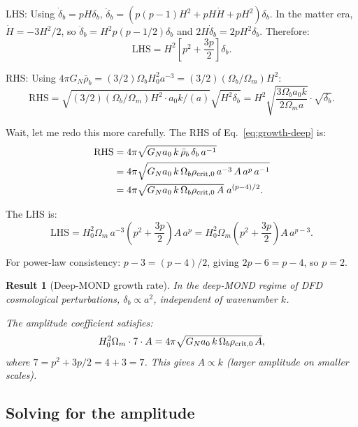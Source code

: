 \documentclass[11pt]{article}
\newtheorem{result}{Result}
\newcommand{\aM}{a_0}
\begin{document}
LHS: Using $\dot\delta_b = pH\delta_b$, $\ddot\delta_b
= (p(p-1)H^2 + pH\dot H + pH^2)\delta_b$. In the matter era,
$\dot H = -3H^2/2$, so $\ddot\delta_b = H^2 p(p - 1/2)\delta_b$
and $2H\dot\delta_b = 2pH^2\delta_b$. Therefore:
\begin{equation}
\text{LHS} = H^2\left[p^2 + \frac{3p}{2}\right]\delta_b.
\end{equation}

RHS: Using $4\pi G_N\bar\rho_b = (3/2)\Omega_b H_0^2 a^{-3}
= (3/2)(\Omega_b/\Omega_m)H^2$:
\begin{equation}
\text{RHS} = \sqrt{(3/2)(\Omega_b/\Omega_m)H^2\cdot\aM k/(a)}\sqrt{H^2\delta_b}
= H^2\sqrt{\frac{3\Omega_b\aM k}{2\Omega_m a}}\cdot\sqrt{\delta_b}.
\end{equation}

Wait, let me redo this more carefully. The RHS of Eq.~\eqref{eq:growth-deep} is:
\begin{align}
\text{RHS} &= 4\pi\sqrt{G_N\aM\,k\,\bar\rho_b\,\delta_b\,a^{-1}} \notag\\
&= 4\pi\sqrt{G_N\aM\,k\,\Omega_b\rho_{\rm crit,0}\,a^{-3}\,A\,a^p\,a^{-1}} \notag\\
&= 4\pi\sqrt{G_N\aM\,k\,\Omega_b\rho_{\rm crit,0}\,A}\;a^{(p-4)/2}.
\end{align}

The LHS is:
\begin{equation}
\text{LHS} = H_0^2\Omega_m\,a^{-3}\left(p^2 + \frac{3p}{2}\right)A\,a^p
= H_0^2\Omega_m\left(p^2 + \frac{3p}{2}\right)A\,a^{p-3}.
\end{equation}

For power-law consistency: $p - 3 = (p-4)/2$, giving $2p - 6 = p - 4$,
so $p = 2$.

\begin{result}[Deep-MOND growth rate]
\label{res:p2}
In the deep-MOND regime of DFD cosmological perturbations,
$\delta_b \propto a^2$, independent of wavenumber $k$.

The amplitude coefficient satisfies:
\begin{equation}
H_0^2\Omega_m\cdot 7\cdot A
= 4\pi\sqrt{G_N\aM\,k\,\Omega_b\rho_{\rm crit,0}\,A},
\label{eq:amplitude}
\end{equation}
where $7 = p^2 + 3p/2 = 4 + 3 = 7$. This gives
$A \propto k$ (larger amplitude on smaller scales).
\end{result}

\subsection{Solving for the amplitude}
\end{document}
